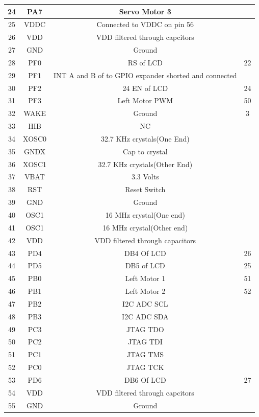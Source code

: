\documentclass[a4paper,10pt,oneside]{article}
\begin{document}
{\begin{longtable}{|c|c|c|c|}
				24 &	PA7 &	Servo Motor 3&\\ \hline
				25 &	VDDC &	Connected to VDDC on pin 56&\\ \hline
				26 &	VDD	 &	VDD filtered through capcitors&\\ \hline
				27 &	GND	 &	Ground&\\ \hline
				28 &	PF0	 &	RS of LCD&22\\ \hline
				29 &	PF1	 &	INT A and B of to GPIO expander shorted and connected&\\ \hline
				30 &	PF2 &	24 EN of LCD&24\\ \hline
				31 &	PF3	 &	Left Motor PWM&50\\ \hline
				32 &	WAKE &	Ground&3\\ \hline
				33 &	HIB &	NC&\\ \hline
				34 &	XOSC0 &	32.7 KHz crystals(One End)&\\ \hline
				35 &	GNDX &	Cap to crystal&\\ \hline
				36 &	XOSC1 &	32.7 KHz crystals(Other End)&\\  \hline
				37 &	VBAT &	3.3 Volts&\\ \hline
				38 &	RST	 &	Reset Switch&\\ \hline
				39 &	GND	 &	Ground&\\ \hline
				40 &	OSC1 &	16 MHz crystal(One end)&\\ \hline
				41 &	OSC1 &	16 MHz crystal(Other end)&\\ \hline
				42 &	VDD	 &	VDD filtered through capacitors&\\ \hline
				43 &	PD4	 &	DB4 Of LCD&26 \\ \hline
				44 &	PD5	 &	DB5 of LCD&25\\ \hline
				45 &	PB0	 & 	Left Motor 1&51\\ \hline
				46 &	PB1	 &	Left Motor 2&52\\ \hline
				47 &	PB2	 &	I2C ADC SCL&\\ \hline 
				48 &	PB3	 &	I2C ADC SDA&\\ \hline
				49 &	PC3	 &	JTAG TDO&\\ \hline
				50 &	PC2	 &	JTAG TDI&\\ \hline
				51 &	PC1	 &	JTAG TMS&\\ \hline
				52 &	PC0	 &	JTAG TCK&\\ \hline
				53 &	PD6	 &	DB6 Of LCD&27\\ \hline
				54 &	VDD	 &	VDD filtered through capcitors&\\ \hline
				55 &	GND	 &	Ground&\\ \hline

\end{longtable}}
\end{document}
